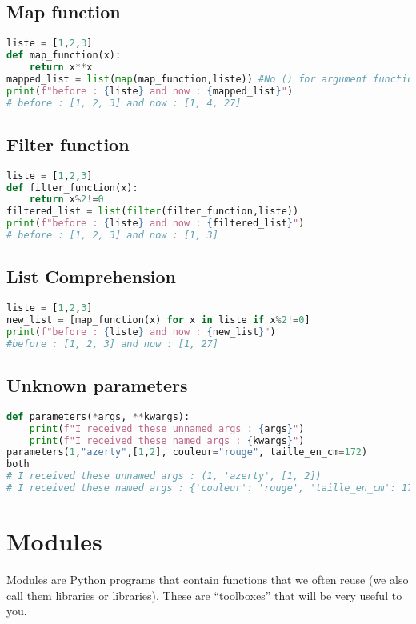 \documentclass[a4paper, 12pt]{article}
\begin{document}
\subsection{Map function}
\begin{lstlisting}[language=Python]
liste = [1,2,3]
def map_function(x):
	return x**x
mapped_list = list(map(map_function,liste)) #No () for argument function
print(f"before : {liste} and now : {mapped_list}")
# before : [1, 2, 3] and now : [1, 4, 27]
\end{lstlisting}

\subsection{Filter function}
\begin{lstlisting}[language=Python]
liste = [1,2,3]
def filter_function(x):
	return x%2!=0
filtered_list = list(filter(filter_function,liste))
print(f"before : {liste} and now : {filtered_list}")
# before : [1, 2, 3] and now : [1, 3]
\end{lstlisting}

\subsection{List Comprehension}
\label{subsec:ListComprehension}
\begin{lstlisting}[language=Python]
liste = [1,2,3]
new_list = [map_function(x) for x in liste if x%2!=0]
print(f"before : {liste} and now : {new_list}")
#before : [1, 2, 3] and now : [1, 27]
\end{lstlisting}

\subsection{Unknown parameters}
\begin{lstlisting}[language=Python]
def parameters(*args, **kwargs):
	print(f"I received these unnamed args : {args}")
	print(f"I received these named args : {kwargs}")
parameters(1,"azerty",[1,2], couleur="rouge", taille_en_cm=172)
both
# I received these unnamed args : (1, 'azerty', [1, 2])
# I received these named args : {'couleur': 'rouge', 'taille_en_cm': 172}
\end{lstlisting}

\newpage
\section{Modules}
Modules are Python programs that contain functions that we often reuse (we also call them libraries or libraries). These are “toolboxes” that will be very useful to you.\newline
\end{document}
